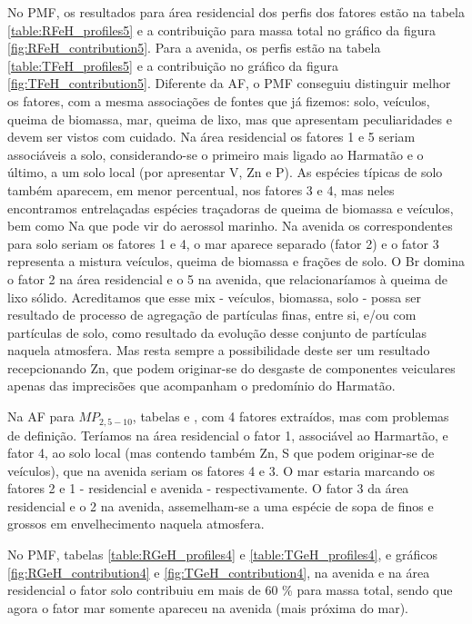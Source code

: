 No PMF, os resultados para área residencial dos perfis dos fatores estão na 
tabela \ref{table:RFeH_profiles5} e a contribuição para massa total no gráfico 
da figura \ref{fig:RFeH_contribution5}. Para a avenida, os perfis estão na 
tabela \ref{table:TFeH_profiles5} e a contribuição no gráfico da figura 
\ref{fig:TFeH_contribution5}. Diferente da AF, o PMF conseguiu distinguir melhor
os fatores, com a mesma associações de fontes que já fizemos: solo, veículos, 
queima de biomassa, mar, queima de lixo, mas que apresentam peculiaridades e 
devem ser vistos com cuidado. Na área residencial os fatores 1 e 5 seriam 
associáveis a solo, considerando-se o primeiro mais ligado ao Harmatão e o 
último, a um solo local (por apresentar V, Zn e P). As espécies típicas de solo 
também aparecem, em menor percentual, nos fatores 3 e 4, mas neles encontramos 
entrelaçadas espécies traçadoras de queima de biomassa e veículos, bem como Na 
que pode vir do aerossol marinho. 
Na avenida os correspondentes para solo seriam os fatores 1 e 4, o mar aparece 
separado (fator 2) e o fator 3 representa a mistura veículos, queima de biomassa
e frações de solo. O Br domina o fator 2 na área residencial e o 5 na avenida, 
que relacionaríamos à queima de lixo sólido. Acreditamos que esse mix - 
veículos, biomassa, solo - possa ser resultado de processo de agregação de 
partículas finas, entre si, e/ou com partículas de solo, como resultado da 
evolução desse conjunto de partículas naquela atmosfera. Mas resta sempre a 
possibilidade deste ser um resultado recepcionando Zn, que podem originar-se do 
desgaste de componentes veiculares apenas das imprecisões que acompanham o 
predomínio do Harmatão.

Na AF para $MP_{2,5-10}$, tabelas \label{table:AF_RGeH4} e \label{table:AF_TGeH4}, 
com 4 fatores extraídos, mas com problemas de definição. Teríamos na área 
residencial o fator 1, associável ao Harmartão, e fator 4, ao solo local 
(mas contendo também Zn, S que podem originar-se de veículos), que na avenida 
seriam os fatores 4 e 3. O mar estaria marcando os fatores 2 e 1 - residencial 
e avenida - respectivamente. O fator 3 da área residencial e o 2 na avenida, 
assemelham-se a uma espécie de sopa de finos e grossos em envelhecimento naquela
atmosfera.

 No PMF, tabelas 
\ref{table:RGeH_profiles4} e \ref{table:TGeH_profiles4}, e gráficos 
\ref{fig:RGeH_contribution4} e \ref{fig:TGeH_contribution4}, na avenida e na
área residencial o fator solo contribuiu em mais de 60 \% para massa total, 
sendo que agora o fator mar somente apareceu na avenida (mais próxima do mar).

